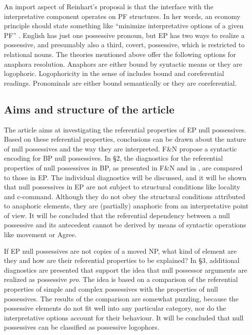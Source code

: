 \documentclass[output=paper]{langsci/langscibook}
\begin{document}
An import aspect of Reinhart’s proposal is that the interface with the interpretative component operates on PF structures. In her words, an economy principle should state something like “minimize interpretative options of a given PF” \citep[103]{Reinhart2006}. English has just one possessive pronoun, but EP has two ways to realize a possessive, and presumably also a third, covert, possessive, which is restricted to relational nouns. The theories mentioned above offer the following options for anaphora resolution. Anaphors are either bound by syntactic means or they are logophoric. Logophoricity in the sense of \citet{Reuland2011} includes bound and coreferential readings. Pronominals are either bound semantically or they are coreferential.

\subsection{Aims and structure of the article}%

The article aims at investigating the referential properties of EP null possessives. Based on these referential properties, conclusions can be drawn about the nature of null possessives and the way they are interpreted. F\&N propose a syntactic encoding for BP null possessives. In §2, the diagnostics for the referential properties of null possessives in BP, as presented in F\&N and in \citet{Rodrigues2010}, are compared to those in EP. The individual diagnostics will be discussed, and it will be shown that null possessives in EP are not subject to structural conditions like locality and c-command. Although they do not obey the structural conditions attributed to anaphoric elements, they are (partially) anaphoric from an interpretative point of view. It will be concluded that the referential dependency between a null possessive and its antecedent cannot be derived by means of syntactic operations like movement or Agree.

If EP null possessives are not copies of a moved NP, what kind of element are they and how are their referential properties to be explained? In §3, additional diagnostics are presented that support the idea that null possessor arguments are realized as possessive \textit{pro}. The idea is based on a comparison of the referential properties of simple and complex possessives with the properties of null possessives. The results of the comparison are somewhat puzzling, because the possessive elements do not fit well into any particular category, nor do the interpretative options account for their behaviour. It will be concluded that null possessives can be classified as possessive logophors.
\end{document}
